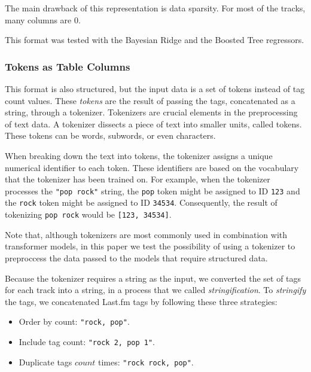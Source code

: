 \documentclass[sn-mathphys]{sn-jnl}%
\theoremstyle{thmstyleone}%
\theoremstyle{thmstyletwo}%
\theoremstyle{thmstylethree}%
\begin{document}
The main drawback of this representation is data sparsity.
For most of the tracks, many columns are \num{0}.

This format was tested with the Bayesian Ridge and the Boosted Tree regressors.



\subsubsection{Tokens as Table Columns}

This format is also structured, but the input data is a set of tokens instead of tag count values.
These \emph{tokens} are the result of passing the tags, concatenated as a string, through a tokenizer.
Tokenizers are crucial elements in the preprocessing of text data.
A tokenizer dissects a piece of text into smaller units, called tokens.
These tokens can be words, subwords, or even characters.


When breaking down the text into tokens, the tokenizer assigns a unique numerical identifier to each token.
These identifiers are based on the vocabulary that the tokenizer has been trained on.
For example, when the tokenizer processes the \verb|"pop rock"| string, the \verb|pop| token might be assigned to ID \verb|123|
and the \verb|rock| token might be assigned to ID \verb|34534|.
Consequently, the result of tokenizing \verb|pop rock| would be \verb|[123, 34534]|.

Note that, although tokenizers are most commonly used in combination with transformer models, in this paper we test the possibility of using a tokenizer to preproccess the data passed to the models that require structured data.

Because the tokenizer requires a string as the input, we converted the set of tags for each track into a string, in a process that we called \emph{stringification}.
To \emph{stringify} the tags, we concatenated Last.fm tags by following these three strategies:

\begin{itemize}
      \item Order by count: \verb|"rock, pop"|.
      \item Include tag count: \verb|"rock 2, pop 1"|.
      \item Duplicate tags $count$ times: \verb|"rock rock, pop"|.
\end{itemize}
\end{document}
